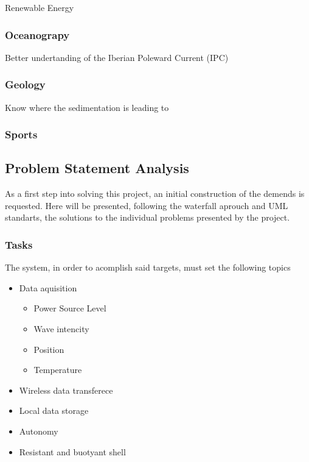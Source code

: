 Renewable Energy 

\subsubsection{Oceanograpy}
Better undertanding of the Iberian Poleward Current (IPC)

\subsubsection{Geology}

Know where the sedimentation is leading to
\subsubsection{Sports}

\subsection{Problem Statement Analysis}
As a first step into solving this project, an initial construction of the
demends is requested. Here will be presented, following the waterfall aprouch
and UML standarts, the solutions to the individual problems presented by the project.

\subsubsection{Tasks}
The system, in order to acomplish said targets, must set the following topics

\begin{itemize}
    \item Data aquisition
    \begin{itemize}
        \item Power Source Level
        \item Wave intencity
        \item Position
        \item Temperature
    \end{itemize}
    \item Wireless data transferece
    \item Local data storage
    \item Autonomy
    \item Resistant and buotyant shell
\end{itemize}





